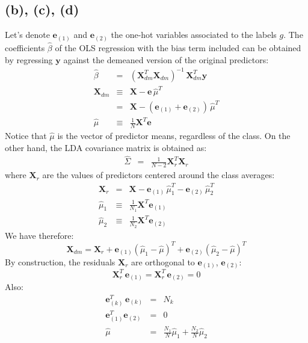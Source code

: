 \subsection*{(b), (c), (d)}
Let's denote $\mathbf{e}_{(1)}$ and $\mathbf{e}_{(2)}$ the one-hot variables associated
to the labels $g$. The coefficients $\hat{\beta}$ of the OLS regression with the bias
term included can be obtained by regressing $\mathbf{y}$ against the demeaned
version of the original predictors:
\begin{eqnarray*}
    \hat{\beta} & = & \left(\mathbf{X}_{dm}^T \mathbf{X}_{dm}\right)^{-1} \,
    \mathbf{X}_{dm}^T \mathbf{y} \\
    \mathbf{X}_{dm} & \equiv &  \mathbf{X} - \mathbf{e} \, \hat{\mu}^T \\
    & = & \mathbf{X} - (\mathbf{e}_{(1)} + \mathbf{e}_{(2)}) \, \hat{\mu}^T \\
    \hat{\mu} & \equiv & \frac{1}{N} \mathbf{X}^T \mathbf{e}
\end{eqnarray*}
Notice that $\hat{\mu}$ is the vector of predictor means, regardless of the class.
On the other hand, the LDA covariance matrix is obtained as:
\begin{eqnarray*}
    \hat{\Sigma} & = & \frac{1}{N - 2} \mathbf{X}_{r}^T \mathbf{X}_r
\end{eqnarray*}
where $\mathbf{X}_{r}$ are the values of predictors centered around the class
averages:
\begin{eqnarray*}
    \mathbf{X}_{r} & = &  \mathbf{X} - \mathbf{e}_{(1)}\,\hat{\mu}_1^T - \mathbf{e}_{(2)}\,\hat{\mu}_2^T \\
    \hat{\mu}_1 & \equiv & \frac{1}{N_1} \mathbf{X}^T \mathbf{e}_{(1)}\\
    \hat{\mu}_2 & \equiv & \frac{1}{N_2} \mathbf{X}^T \mathbf{e}_{(2)}
\end{eqnarray*}
We have therefore:
\begin{equation*}
\mathbf{X}_{dm} = \mathbf{X}_r + \mathbf{e}_{(1)} \left(\hat{\mu}_1 - \hat{\mu}\right)^T
 + \mathbf{e}_{(2)} \left(\hat{\mu}_2 - \hat{\mu}\right)^T
\end{equation*}
By construction, the residuals $\mathbf{X}_r$ are orthogonal to $\mathbf{e}_{(1)}$, 
$\mathbf{e}_{(2)}$:
\begin{equation*}
\mathbf{X}_r^T \,\mathbf{e}_{(1)} = \mathbf{X}_r^T \,\mathbf{e}_{(2)} = 0
\end{equation*}
Also:
\begin{eqnarray*}
    \mathbf{e}_{(k)}^T\, \mathbf{e}_{(k)} & = & N_k \\
    \mathbf{e}_{(1)}^T \mathbf{e}_{(2)} & = & 0 \\
    \hat{\mu} & = & \frac{N_1}{N} \hat{\mu}_1 + \frac{N_2}{N} \hat{\mu}_2    
\end{eqnarray*}
